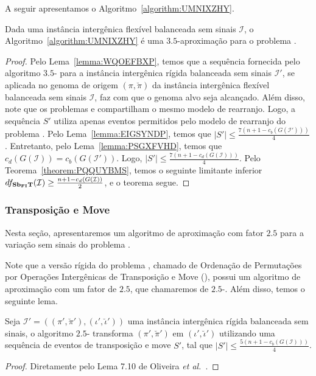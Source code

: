 A seguir apresentamos o Algoritmo~\ref{algorithm:UMNIXZHY}.



\begin{theorem}\label{theorem:PSELGHNY}
Dada uma instância intergênica flexível balanceada sem sinais $\mathcal{I}$, o Algoritmo~\ref{algorithm:UMNIXZHY} é uma $3.5$-aproximação para o problema \SbFIT{}.
\end{theorem}
\begin{proof}
Pelo Lema~\ref{lemma:WQOEFBXP}, temos que a sequência fornecida pelo algoritmo $3.5$-\SbIT{} para a instância intergênica rígida balanceada sem sinais $\mathcal{I'}$, se aplicada no genoma de origem $(\pi,\breve\pi)$ da instância intergênica flexível balanceada sem sinais $\mathcal{I}$, faz com que o genoma alvo seja alcançado. Além disso, note que os problemas \SbIT{} e \SbFIT{} compartilham o mesmo modelo de rearranjo. Logo, a sequência $S'$ utiliza apenas eventos permitidos pelo modelo de rearranjo do problema \SbFIT{}. Pelo Lema~\ref{lemma:EIGSYNDP}, temos que $|S'| \le \frac{7({n+1} - c_b(G(\mathcal{I}')))}{4}$. Entretanto, pelo Lema~\ref{lemma:PSGXFVHD}, temos que $c_d(G(\mathcal{I})) = c_b(G(\mathcal{I}'))$. Logo, $|S'| \le \frac{7({n+1} - c_d(G(\mathcal{I})))}{4}$. Pelo Teorema~\ref{theorem:PQQUYBMS}, temos o seguinte limitante inferior $df_{\textbf{Sb\textsubscript{FI}T}}(\mathcal{I}) \ge \frac{{n+1} - c_d(G(\mathcal{I}))}{2}$, e o teorema segue.
\end{proof}

\subsubsection{Transposição e Move}

Nesta seção, apresentaremos um algoritmo de aproximação com fator $2.5$ para a variação sem sinais do problema \SbFITM{}. 

Note que a versão rígida do problema \SbFITM{}, chamado de Ordenação de Permutações por Operações Intergênicas de Transposição e Move (\SbITM), possui um algoritmo de aproximação com um fator de $2.5$, que chamaremos de $2.5$-\SbITM{}. Além disso, temos o seguinte lema.

\begin{lemma}\label{lemma:PDDYJXYT}
Seja $\mathcal{I}' = ((\pi',\breve\pi'),(\iota',\breve\iota'))$ uma instância intergênica rígida balanceada sem sinais, o algoritmo $2.5$-\SbITM{} transforma $(\pi',\breve\pi')$ em $(\iota',\breve\iota')$ utilizando uma sequência de eventos de transposição e move $S'$, tal que $|S'| \le \frac{5({n+1} - c_b(G(\mathcal{I})))}{4}$.
\end{lemma}
\begin{proof}
Diretamente pelo Lema 7.10 de Oliveira \textit{et al.}~\cite{2021a-oliveira-etal}.
\end{proof}

